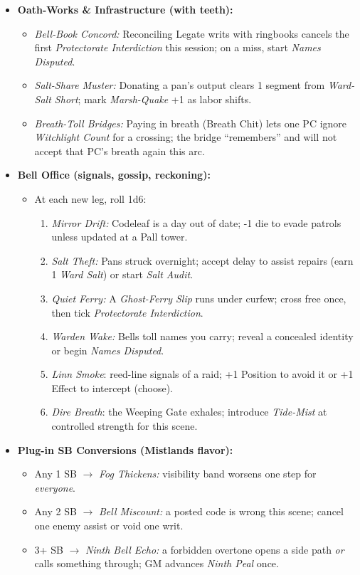 \begin{itemize}
  \item \textbf{Oath-Works \& Infrastructure (with teeth):}
  \begin{itemize}
    \item \emph{Bell-Book Concord:} Reconciling Legate writs with ringbooks cancels the first \emph{Protectorate Interdiction} this session; on a miss, start \emph{Names Disputed}.
    \item \emph{Salt-Share Muster:} Donating a pan’s output clears 1 segment from \emph{Ward-Salt Short}; mark \emph{Marsh-Quake} +1 as labor shifts.
    \item \emph{Breath-Toll Bridges:} Paying in breath (Breath Chit) lets one PC ignore \emph{Witchlight Count} for a crossing; the bridge “remembers” and will not accept that PC’s breath again this arc.
  \end{itemize}

  \item \textbf{Bell Office (signals, gossip, reckoning):}
  \begin{itemize}
    \item At each new leg, roll 1d6:
    \begin{enumerate}
      \item \emph{Mirror Drift:} Codeleaf is a day out of date; -1 die to evade patrols unless updated at a Pall tower.
      \item \emph{Salt Theft:} Pans struck overnight; accept delay to assist repairs (earn 1 \emph{Ward Salt}) or start \emph{Salt Audit}.
      \item \emph{Quiet Ferry:} A \emph{Ghost-Ferry Slip} runs under curfew; cross free once, then tick \emph{Protectorate Interdiction}.
      \item \emph{Warden Wake:} Bells toll names you carry; reveal a concealed identity or begin \emph{Names Disputed}.
      \item \emph{Linn Smoke}: reed-line signals of a raid; +1 Position to avoid it or +1 Effect to intercept (choose).
      \item \emph{Dire Breath}: the Weeping Gate exhales; introduce \emph{Tide-Mist} at controlled strength for this scene.
    \end{enumerate}
  \end{itemize}

  \item \textbf{Plug-in SB Conversions (Mistlands flavor):}
  \begin{itemize}
    \item Any 1 SB \(\rightarrow\) \emph{Fog Thickens:} visibility band worsens one step for \emph{everyone}.
    \item Any 2 SB \(\rightarrow\) \emph{Bell Miscount:} a posted code is wrong this scene; cancel one enemy assist or void one writ.
    \item 3+ SB \(\rightarrow\) \emph{Ninth Bell Echo:} a forbidden overtone opens a side path \emph{or} calls something through; GM advances \emph{Ninth Peal} once.
  \end{itemize}


\end{itemize}

